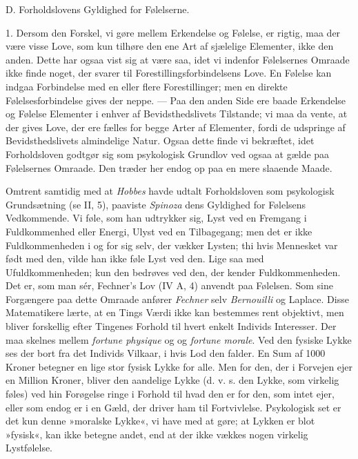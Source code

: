 \documentclass[12pt,a4paper,openany]{book}
\newcommand{\opage}[1]{\marginnote{\footnotesize\textit{[#1]}}}
\begin{document}
\begin{center}D. Forholdslovens Gyldighed for Følelserne.\end{center}

1. Dersom den Forskel, vi gøre mellem Erkendelse og Følelse, er rigtig,
maa der være visse Love, som kun tilhøre den ene Art af sjælelige
Elementer, ikke den anden. Dette har ogsaa vist sig at være saa, idet vi
indenfor Følelsernes Omraade ikke finde noget, der svarer til
Forestillingsforbindelsens Love. En Følelse kan indgaa Forbindelse med
en eller flere Forestillinger; men en direkte Følelsesforbindelse gives
der neppe. --- Paa den anden Side ere baade Erkendelse og Følelse
Elementer i enhver af Bevidsthedslivets Tilstande; vi maa da vente, at
der gives Love, der ere fælles for begge Arter af Elementer, fordi de
udspringe af Bevidsthedslivets almindelige Natur. Ogsaa dette finde vi
bekræftet, idet Forholdsloven godtgør sig som psykologisk Grundlov ved
ogsaa at gælde paa Følelsernes Omraade. Den træder her endog op paa en
mere slaaende Maade.

Omtrent samtidig med at \emph{Hobbes} havde udtalt Forholdsloven som
psykologisk Grundsætning (se II, 5), paaviste \emph{Spinoza} dens
Gyldighed for Følelsens Vedkommende. Vi føle, som han udtrykker sig,
Lyst ved en Fremgang i Fuldkommenhed eller Energi, Ulyst ved en
Tilbagegang; men det er ikke Fuldkommenheden i og for sig selv, der
vækker Lysten; thi hvis Mennesket var født med den, vilde han ikke føle
Lyst ved den. Lige saa med Ufuldkommenheden; kun den bedrøves ved den,
der kender Fuldkommenheden. Det er, som man sér, Fechner’s Lov (IV A, 4)
anvendt paa Følelsen. Som sine Forgængere paa dette Omraade anfører
\emph{Fechner} selv \emph{Bernouilli} og Laplace. Disse Matematikere
lærte, at en Tings Værdi ikke kan bestemmes rent objektivt, men bliver
forskellig efter Tingenes Forhold til hvert enkelt Individs Interesser.
Der maa skelnes mellem \emph{fortune physique} og og \emph{fortune
morale}. Ved den fysiske Lykke ses der bort fra det Individs Vilkaar, i
hvis Lod den falder. En Sum af 1000 Kroner betegner en lige stor fysisk
Lykke for alle. Men for den, der i Forvejen ejer en Million Kroner,
bliver den
\opage{327}aandelige Lykke (d. v. s. den Lykke, som virkelig føles) ved
hin Forøgelse ringe i Forhold til hvad den er for den, som intet ejer,
eller som endog er i en Gæld, der driver ham til Fortvivlelse.
Psykologisk set er det kun denne »moralske Lykke«, vi have med at gøre;
at Lykken er blot »fysisk«, kan ikke betegne andet, end at der ikke
vækkes nogen virkelig Lystfølelse.
\end{document}
